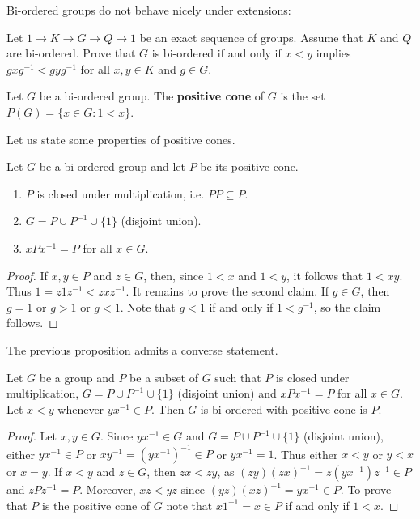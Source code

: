 Bi-ordered groups do not behave nicely under extensions:

\begin{exercise}
\label{xca:BO_sequence}
    Let $1\to K\to G\to Q\to 1$ be an exact sequence of groups. Assume that $K$ and $Q$ 
    are bi-ordered. Prove that $G$ is bi-ordered if and only if 
    $x<y$ implies $gxg^{-1}<gyg^{-1}$ for all $x,y\in K$ and $g\in G$. 
\end{exercise}

\begin{definition}
	Let $G$ be a bi-ordered group. The \textbf{positive cone} of $G$  
	is the set $P(G)=\{x\in
	G:1<x\}$.
\end{definition}

Let us state some properties of positive cones. 

\begin{proposition}
	\label{pro:biordenableP1}
	Let $G$ be a bi-ordered group and let $P$ be its positive cone. 
	\begin{enumerate}
		\item $P$ is closed under multiplication, i.e. $PP\subseteq P$. 
		\item $G=P\cup P^{-1}\cup \{1\}$ (disjoint union).
		\item $xPx^{-1}=P$ for all $x\in G$.
	\end{enumerate}
\end{proposition}

\begin{proof}
	If $x,y\in P$ and $z\in G$, then, since $1<x$ and $1<y$, it follows that 
	$1<xy$.  Thus $1=z1z^{-1}<zxz^{-1}$. It remains to prove the second claim.  
	If $g\in G$, then $g=1$ or $g>1$ or $g<1$. Note that $g<1$ if and only if 
	$1<g^{-1}$, so the claim follows. 
\end{proof}

The previous proposition admits a converse statement. 

\begin{proposition}
	\label{pro:biordenableP2}
	Let $G$ be a group and $P$ be a subset of $G$ such that 
	$P$ is closed under multiplication, $G=P\cup P^{-1}\cup \{1\}$ (disjoint union) and
	$xPx^{-1}=P$ for all $x\in G$. Let $x<y$ whenever  
	$yx^{-1}\in P$. Then $G$ is bi-ordered with positive
	cone is $P$.
\end{proposition}

\begin{proof}
	Let $x,y\in G$. Since $yx^{-1}\in G$ and $G=P\cup
	P^{-1}\cup\{1\}$ (disjoint union), 
	either $yx^{-1}\in P$ or $xy^{-1}=(yx^{-1})^{-1}\in
	P$ or $yx^{-1}=1$. Thus either $x<y$ or $y<x$ or $x=y$. If $x<y$ and $z\in
	G$, then $zx<zy$, as $(zy)(zx)^{-1}=z(yx^{-1})z^{-1}\in P$ and  
	$zPz^{-1}=P$. Moreover, $xz<yz$ since $(yz)(xz)^{-1}=yx^{-1}\in P$. To prove
	that $P$ is the positive cone of $G$ note that 
	$x1^{-1}=x\in P$ if and only if $1<x$. 
\end{proof}

